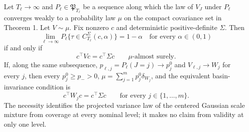 Let \(T_\ell\to\infty\) and \(P_\ell\in\mathfrak P_{T_\ell}\) be a sequence along which the law of \(V_J\) under \(P_\ell\) converges weakly to a probability law \(\mu\) on the compact covariance set in Theorem 1. Let \(V\sim\mu\). Fix nonzero \(c\) and deterministic positive-definite \(\Sigma\). Then
\[
 \lim_{\ell\to\infty}P_\ell\{\tau\in C_{T_\ell}^{\Sigma}(c,\alpha)\}=1-\alpha
 \quad\text{for every }\alpha\in(0,1)
\]
if and only if
\[
 c^\top Vc=c^\top\Sigma c\qquad\mu\text{-almost surely}.
\]
If, along the same subsequence, \(p_{\ell,j}=P_\ell(J=j)\to p_j^0\) and \(V_{\ell,j}\to W_j\) for every \(j\), then every \(p_j^0\ge p_->0\), \(\mu=\sum_{j=1}^mp_j^0\delta_{W_j}\), and the equivalent basin-invariance condition is
\[
 c^\top W_jc=c^\top\Sigma c\qquad\text{for every }j\in\{1,\ldots,m\}.
\]
The necessity identifies the projected variance law of the centered Gaussian scale mixture from coverage at every nominal level; it makes no claim from validity at only one level.